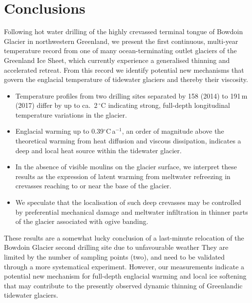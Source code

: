 \documentclass[utf8]{article}
\begin{document}
\section{Conclusions}

    Following hot water drilling of the highly crevassed terminal tongue of
    Bowdoin Glacier in northwestern Greenland, we present the first continuous,
    multi-year temperature record from one of many ocean-terminating outlet
    glaciers of the Greenland Ice Sheet, which currently experience a
    generalised thinning and accelerated retreat. From this record we identify
    potential new mechanisms that govern the englacial temperature of tidewater
    glaciers and thereby their viscosity.

    \begin{itemize}

      \item Temperature profiles from two drilling sites separated by 158
        (2014) to 191\,m (2017) differ by up to ca.~2\,$^\circ$C indicating
        strong, full-depth longitudinal temperature variations in the glacier.

      \item Englacial warming up to 0.39$^\circ$C\,a$^{-1}$, an order of
        magnitude above the theoretical warming from heat diffusion and viscous
        dissipation, indicates a deep and local heat source within the
        tidewater glacier.

      \item In the absence of visible moulins on the glacier surface, we interpret
        these results as the expression of latent warming from meltwater
        refreezing in crevasses reaching to or near the base of the glacier.

      \item We speculate that the localisation of such deep crevasses may be
        controlled by preferential mechanical damage and meltwater infiltration
        in thinner parts of the glacier associated with ogive banding.

    \end{itemize}

    These results are a somewhat lucky conclusion of a last-minute relocation
    of the Bowdoin Glacier second drilling site due to unfavourable weather
    They are limited by the number of sampling points (two), and need to
    be validated through a more systematical experiment. However, our
    measurements indicate
    a potential new mechanism for full-depth englacial warming and local
    ice softening that may contribute to the presently observed dynamic
    thinning of Greenlandic tidewater glaciers.
\end{document}
